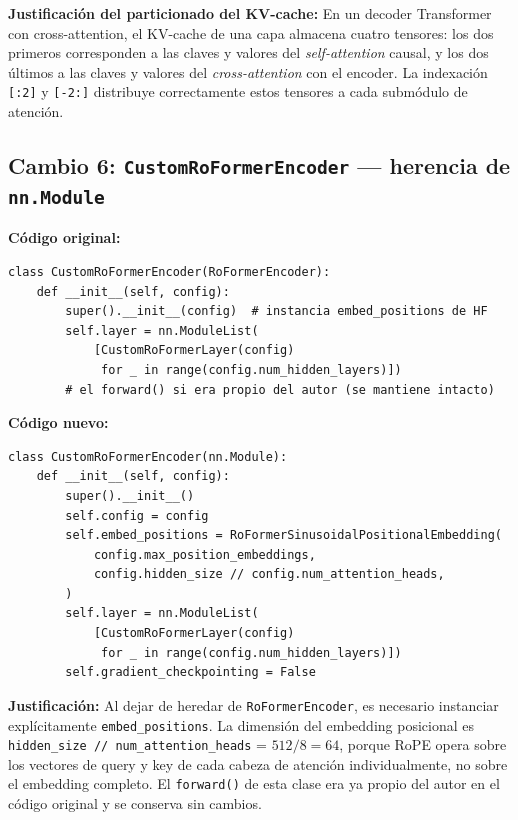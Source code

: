 \documentclass[12pt,a4paper]{article}
\begin{document}
\begin{notebox}
\textbf{Justificación del particionado del KV-cache:} En un decoder Transformer con
cross-attention, el KV-cache de una capa almacena cuatro tensores: los dos primeros
corresponden a las claves y valores del \textit{self-attention} causal, y los dos
últimos a las claves y valores del \textit{cross-attention} con el encoder. La
indexación \texttt{[:2]} y \texttt{[-2:]} distribuye correctamente estos tensores a
cada submódulo de atención.
\end{notebox}

\subsection{Cambio 6: \texttt{CustomRoFormerEncoder} --- herencia de \texttt{nn.Module}}

\textbf{Código original:}
\begin{lstlisting}[caption={CustomRoFormerEncoder original}]
class CustomRoFormerEncoder(RoFormerEncoder):
    def __init__(self, config):
        super().__init__(config)  # instancia embed_positions de HF
        self.layer = nn.ModuleList(
            [CustomRoFormerLayer(config)
             for _ in range(config.num_hidden_layers)])
        # el forward() si era propio del autor (se mantiene intacto)
\end{lstlisting}

\textbf{Código nuevo:}
\begin{lstlisting}[caption={CustomRoFormerEncoder corregida}]
class CustomRoFormerEncoder(nn.Module):
    def __init__(self, config):
        super().__init__()
        self.config = config
        self.embed_positions = RoFormerSinusoidalPositionalEmbedding(
            config.max_position_embeddings,
            config.hidden_size // config.num_attention_heads,
        )
        self.layer = nn.ModuleList(
            [CustomRoFormerLayer(config)
             for _ in range(config.num_hidden_layers)])
        self.gradient_checkpointing = False
\end{lstlisting}

\begin{notebox}
\textbf{Justificación:} Al dejar de heredar de \texttt{RoFormerEncoder}, es necesario
instanciar explícitamente \texttt{embed\_positions}. La dimensión del embedding
posicional es \texttt{hidden\_size // num\_attention\_heads} = $512 / 8 = 64$, porque
RoPE opera sobre los vectores de query y key de cada cabeza de atención
individualmente, no sobre el embedding completo. El \texttt{forward()} de esta clase
era ya propio del autor en el código original y se conserva sin cambios.
\end{notebox}
\end{document}
